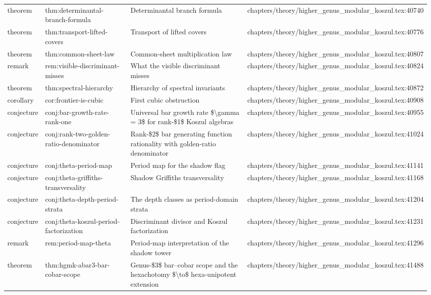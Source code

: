\documentclass[11pt]{article}
\begin{document}
\begin{longtable}{L{0.10\textwidth}L{0.26\textwidth}L{0.42\textwidth}L{0.22\textwidth}}
theorem & thm:determinantal-branch-formula & Determinantal branch formula & chapters/theory/higher\_genus\_modular\_koszul.tex:40740\\
theorem & thm:transport-lifted-covers & Transport of lifted covers & chapters/theory/higher\_genus\_modular\_koszul.tex:40776\\
theorem & thm:common-sheet-law & Common-sheet multiplication law & chapters/theory/higher\_genus\_modular\_koszul.tex:40807\\
remark & rem:visible-discriminant-misses & What the visible discriminant misses & chapters/theory/higher\_genus\_modular\_koszul.tex:40824\\
theorem & thm:spectral-hierarchy & Hierarchy of spectral invariants & chapters/theory/higher\_genus\_modular\_koszul.tex:40872\\
corollary & cor:frontier-is-cubic & First cubic obstruction & chapters/theory/higher\_genus\_modular\_koszul.tex:40908\\
conjecture & conj:bar-growth-rate-rank-one & Universal bar growth rate \$\textbackslash{}gamma = 3\$ for rank-\$1\$ Koszul algebras & chapters/theory/higher\_genus\_modular\_koszul.tex:40955\\
conjecture & conj:rank-two-golden-ratio-denominator & Rank-\$2\$ bar generating function rationality with golden-ratio denominator & chapters/theory/higher\_genus\_modular\_koszul.tex:41024\\
conjecture & conj:theta-period-map & Period map for the shadow flag & chapters/theory/higher\_genus\_modular\_koszul.tex:41141\\
conjecture & conj:theta-griffiths-transversality & Shadow Griffiths transversality & chapters/theory/higher\_genus\_modular\_koszul.tex:41168\\
conjecture & conj:theta-depth-period-strata & The depth classes as period-domain strata & chapters/theory/higher\_genus\_modular\_koszul.tex:41204\\
conjecture & conj:theta-koszul-period-factorization & Discriminant divisor and Koszul factorization & chapters/theory/higher\_genus\_modular\_koszul.tex:41231\\
remark & rem:period-map-theta & Period-map interpretation of the shadow tower & chapters/theory/higher\_genus\_modular\_koszul.tex:41296\\
theorem & thm:hgmk-abar3-bar-cobar-scope & Genus-\$3\$ bar--cobar scope and the hexachotomy \$\textbackslash{}to\$ hexa-unipotent extension & chapters/theory/higher\_genus\_modular\_koszul.tex:41488\\

\end{longtable}
\end{document}
